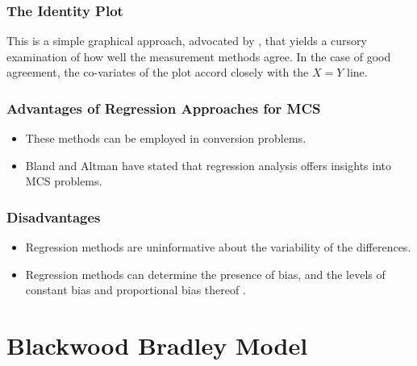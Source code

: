 \documentclass[MAIN.tex]{subfiles}
\begin{document}
\subsubsection{The Identity Plot} This is a simple graphical approach, advocated by \citet{BA86}, that yields a cursory examination of how well the measurement methods agree. In the case of good agreement, the co-variates of the plot accord closely with the $X=Y$ line.

\subsubsection{Advantages of Regression Approaches for MCS}
\begin{itemize}
	\item These methods can be employed in conversion problems.
	\item Bland and Altman have stated that regression analysis offers insights into MCS problems.
\end{itemize}
\subsubsection{Disadvantages}
\begin{itemize}
	\item Regression methods are uninformative about the variability of the differences.
\end{itemize}

\begin{itemize}\item
	Regression methods can determine the presence of bias, and the levels of constant bias and proportional bias thereof \cite{ludbrook97,ludbrook02}.
\end{itemize}

	\section{Blackwood Bradley Model} 
	
\end{document}
